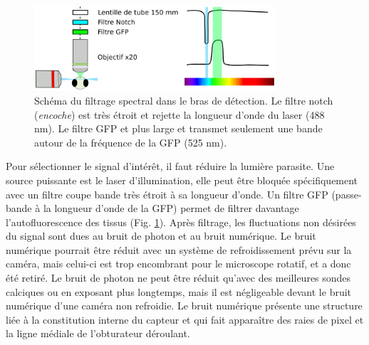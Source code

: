 \begin{figure}
    \centering
    \includegraphics[width=0.8\textwidth]{./files/detection_unit.svg.png}
    \caption{Schéma du filtrage spectral dans le bras de détection. Le filtre notch (\emph{encoche}) est très étroit et rejette la longueur d'onde du laser (488 nm). Le filtre GFP et plus large et transmet seulement une bande autour de la fréquence de la GFP (525 nm).
    \label{FIGspectralfiltering}}
    \end{figure}


Pour sélectionner le signal d'intérêt, il faut réduire la lumière parasite. Une source puissante est le laser d'illumination, elle peut être bloquée spécifiquement avec un filtre coupe bande très étroit à sa longueur d'onde. Un filtre GFP (passe-bande à la longueur d'onde de la GFP) permet de filtrer davantage l'autofluorescence des tissus (Fig. \ref{FIGspectralfiltering}). Après filtrage, les fluctuations non désirées du signal sont dues au bruit de photon et au bruit numérique. Le bruit numérique pourrait être réduit avec un système de refroidissement prévu sur la caméra, mais celui-ci est trop encombrant pour le microscope rotatif, et a donc été retiré. Le bruit de photon ne peut être réduit qu'avec des meilleures sondes calciques ou en exposant plus longtemps, mais il est négligeable devant le bruit numérique d'une caméra non refroidie. Le bruit numérique présente une structure liée à la constitution interne du capteur et qui fait apparaître des raies de pixel et la ligne médiale de l'obturateur déroulant.


